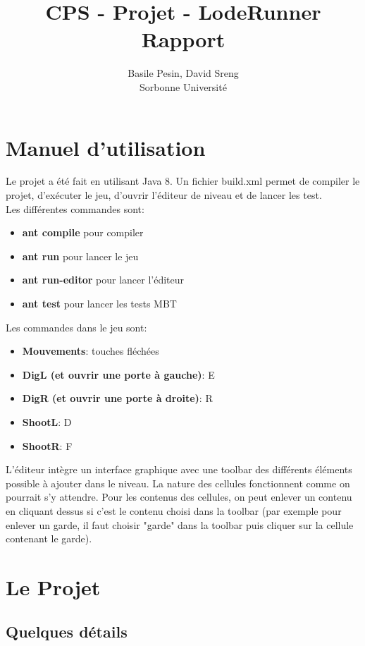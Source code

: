\documentclass{article}
\title{CPS - Projet - LodeRunner\\Rapport}
\author{Basile Pesin, David Sreng\\Sorbonne Université}
\begin{document}
\maketitle

\section{Manuel d'utilisation}

Le projet a été fait en utilisant Java 8. Un fichier build.xml permet de compiler le projet, d'exécuter le jeu, d'ouvrir l'éditeur de niveau et de lancer les test.\\
Les différentes commandes sont:
\begin{itemize}
\item \textbf{ant compile} pour compiler
\item \textbf{ant run} pour lancer le jeu
\item \textbf{ant run-editor} pour lancer l'éditeur
\item \textbf{ant test} pour lancer les tests MBT
\end{itemize}
Les commandes dans le jeu sont:
\begin{itemize}
\item \textbf{Mouvements}: touches fléchées
\item \textbf{DigL (et ouvrir une porte à gauche)}: E
\item \textbf{DigR (et ouvrir une porte à droite)}: R
\item \textbf{ShootL}: D
\item \textbf{ShootR}: F
\end{itemize}
L'éditeur intègre un interface graphique avec une toolbar des différents éléments possible à ajouter dans le niveau. La nature des cellules fonctionnent comme on pourrait s'y attendre. Pour les contenus des cellules, on peut enlever un contenu en cliquant dessus si c'est le contenu choisi dans la toolbar (par exemple pour enlever un garde, il faut choisir "garde" dans la toolbar puis cliquer sur la cellule contenant le garde). 

\section{Le Projet}

\subsection{Quelques détails}
\end{document}
